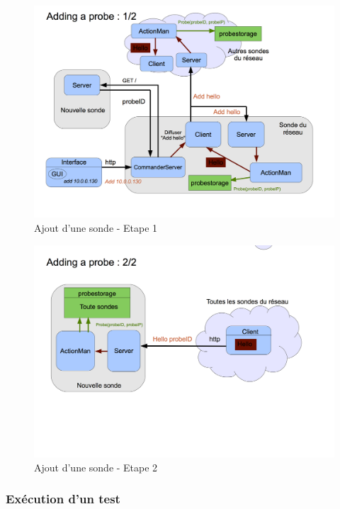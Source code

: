 \documentclass[a4paper,11pt]{article}
\begin{document}
\begin{figure}[!ht]
\centering\includegraphics[width=\linewidth]{img/graphAdd1.png}
\caption{Ajout d'une sonde - Etape 1}
\end{figure}




\begin{figure}[!ht]
\centering\includegraphics[width=\linewidth]{img/graphAdd2.png}
\caption{Ajout d'une sonde - Etape 2}
\end{figure}

\FloatBarrier
\subsubsection{Exécution d'un test}
\end{document}
